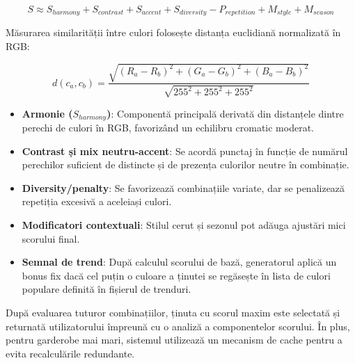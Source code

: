 \begin{equation}
S \approx S_{harmony} + S_{contrast} + S_{accent} + S_{diversity} - P_{repetition} + M_{style} + M_{season}
\label{eq:compatibility_score_rgb}
\end{equation}

Măsurarea similarității între culori folosește distanța euclidiană normalizată în RGB:

\begin{equation}
d(c_a, c_b)=\frac{\sqrt{(R_a-R_b)^2+(G_a-G_b)^2+(B_a-B_b)^2}}{\sqrt{255^2+255^2+255^2}}
\end{equation}

\begin{itemize}
    \item \textbf{Armonie ($S_{harmony}$)}: Componentă principală derivată din distanțele dintre perechi de culori în RGB, favorizând un echilibru cromatic moderat.
    
    \item \textbf{Contrast și mix neutru-accent}: Se acordă punctaj în funcție de numărul perechilor suficient de distincte și de prezența culorilor neutre în combinație.
    
    \item \textbf{Diversity/penalty}: Se favorizează combinațiile variate, dar se penalizează repetiția excesivă a aceleiași culori.
    
    \item \textbf{Modificatori contextuali}: Stilul cerut și sezonul pot adăuga ajustări mici scorului final.
    
    \item \textbf{Semnal de trend}: După calculul scorului de bază, generatorul aplică un bonus fix dacă cel puțin o culoare a ținutei se regăsește în lista de culori populare definită în fișierul de trenduri.
\end{itemize}

După evaluarea tuturor combinațiilor, ținuta cu scorul maxim este selectată și returnată utilizatorului împreună cu o analiză a componentelor scorului. În plus, pentru garderobe mai mari, sistemul utilizează un mecanism de cache pentru a evita recalculările redundante.
